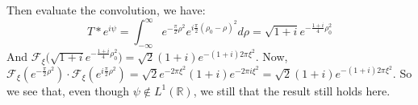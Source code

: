             \par\hfill\par
            Then evaluate the convolution, we have:
            \begin{equation}
                T*e^{i\psi}=
                \int_{-\infty}^{\infty}
                e^{-\frac{\pi}{2}\rho^2}
                e^{i\frac{\pi}{2}(\rho_0-\rho)^2}d\rho
                =\sqrt{1+i}e^{-\frac{1+i}{4}\rho_0^2}
            \end{equation}
            And $\mathcal{F}_{\xi}\big(\sqrt{1+i}e^{-\frac{1+i}{4}\rho_0^2}\big) = \sqrt{2}(1+i)e^{-(1+i)2\pi \xi^2}$. Now, $\mathcal{F}_{\xi}(e^{-\frac{\pi}{2}\rho^2})\cdot \mathcal{F}_{\xi}(e^{i\frac{\pi}{2}\rho^2}) = \sqrt{2}e^{-2\pi \xi^2}(1+i)e^{-2\pi i \xi^2} = \sqrt{2}(1+i)e^{-(1+i)2\pi \xi^2}$. So we see that, even though $\psi \notin L^{1}(\mathbb{R})$, we still that the result still holds here. 
